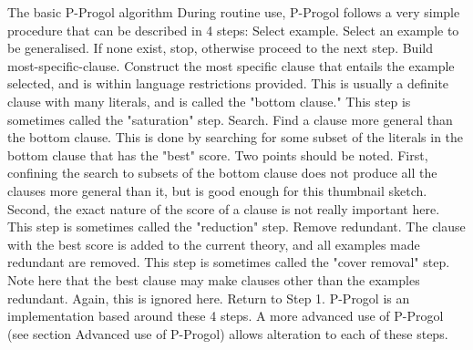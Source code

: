 The basic P-Progol algorithm
During routine use, P-Progol follows a very simple procedure that can be described in 4 steps:
Select example. Select an example to be generalised. If none exist, stop, otherwise proceed to the next step.
Build most-specific-clause. Construct the most specific clause that entails the example selected, and is within language restrictions provided. This is usually a definite clause with many literals, and is called the "bottom clause." This step is sometimes called the "saturation" step.
Search. Find a clause more general than the bottom clause. This is done by searching for some subset of the literals in the bottom clause that has the "best" score. Two points should be noted. First, confining the search to subsets of the bottom clause does not produce all the clauses more general than it, but is good enough for this thumbnail sketch. Second, the exact nature of the score of a clause is not really important here. This step is sometimes called the "reduction" step.
Remove redundant. The clause with the best score is added to the current theory, and all examples made redundant are removed. This step is sometimes called the "cover removal" step. Note here that the best clause may make clauses other than the examples redundant. Again, this is ignored here. Return to Step 1.
P-Progol is an implementation based around these 4 steps. A more advanced use of P-Progol (see section Advanced use of P-Progol) allows alteration to each of these steps.


